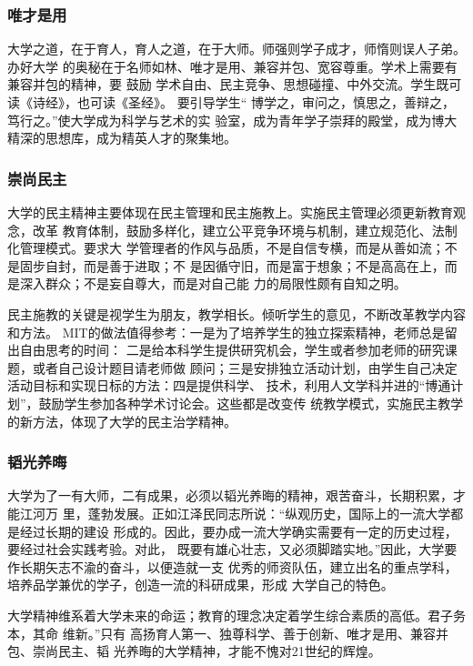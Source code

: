 \documentclass[11pt]{ctexart}
\begin{document}
{{{{\subsubsection{唯才是用}
\label{sec:org6b2e196}

大学之道，在于育人，育人之道，在于大师。师强则学子成才，师惰则误人子弟。办好大学
的奥秘在于名师如林、唯才是用、兼容并包、宽容尊重。学术上需要有兼容并包的精神，要
鼓励 学术自由、民主竞争、思想碰撞、中外交流。学生既可读《诗经》，也可读《圣经》。
要引导学生“ 博学之，审问之，慎思之，善辩之，笃行之。”使大学成为科学与艺术的实
验室，成为青年学子崇拜的殿堂，成为博大精深的思想库，成为精英人才的聚集地。


\subsubsection{崇尚民主}
\label{sec:org8d1b9eb}

大学的民主精神主要体现在民主管理和民主施教上。实施民主管理必须更新教育观念，改革
教育体制，鼓励多样化，建立公平竞争环境与机制，建立规范化、法制化管理模式。要求大
学管理者的作风与品质，不是自信专横，而是从善如流；不是固步自封，而是善于进取；不
是因循守旧，而是富于想象；不是高高在上，而是深入群众；不是妄自尊大，而是对自己能
力的局限性颇有自知之明。


民主施教的关键是视学生为朋友，教学相长。倾听学生的意见，不断改革教学内容和方法。
MIT的做法值得参考：一是为了培养学生的独立探索精神，老师总是留出自由思考的时间：
二是给本科学生提供研究机会，学生或者参加老师的研究课题，或者自己设计题目请老师做
顾问；三是安排独立活动计划，由学生自己决定活动目标和实现日标的方法：四是提供科学、
技术，利用人文学科并进的“博通计划”，鼓励学生参加各种学术讨论会。这些都是改变传
统教学模式，实施民主教学的新方法，体现了大学的民主治学精神。


\subsubsection{韬光养晦}
\label{sec:orgddc7fb3}

大学为了一有大师，二有成果，必须以韬光养晦的精神，艰苦奋斗，长期积累，才能江河万
里，蓬勃发展。正如江泽民同志所说：“纵观历史，国际上的一流大学都是经过长期的建设
形成的。因此，要办成一流大学确实需要有一定的历史过程，要经过社会实践考验。对此，
既要有雄心壮志，又必须脚踏实地。”因此，大学要作长期矢志不渝的奋斗，以便造就一支
优秀的师资队伍，建立出名的重点学科，培养品学兼优的学子，创造一流的科研成果，形成
大学自己的特色。


大学精神维系着大学未来的命运；教育的理念决定着学生综合素质的高低。君子务本，其命
维新。”只有 高扬育人第一、独尊科学、善于创新、唯才是用、兼容并包、崇尚民主、韬
光养晦的大学精神，才能不愧对21世纪的辉煌。


}}}}
\end{document}

